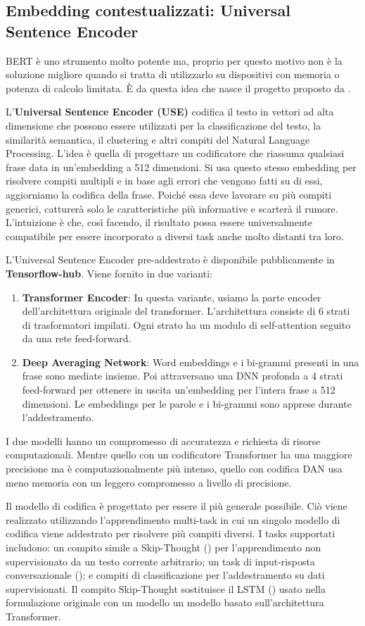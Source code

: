 \subsection{Embedding contestualizzati: Universal Sentence Encoder}
BERT è uno strumento molto potente ma, proprio per questo motivo non è la soluzione migliore quando si tratta di utilizzarlo su dispositivi con memoria o potenza di calcolo limitata. È da questa idea che nasce il progetto proposto da \citet{cer2018universal}.

L'\textbf{Universal Sentence Encoder (USE)} codifica il testo in vettori ad alta dimensione che possono essere utilizzati per la classificazione del testo, la similarità semantica, il clustering e altri compiti del Natural Language Processing. L'idea è quella di progettare un codificatore che riassuma qualsiasi frase data in un'embedding a 512 dimensioni. Si usa questo stesso embedding per risolvere compiti multipli e in base agli errori che vengono fatti su di essi, aggiorniamo la codifica della frase. Poiché essa deve lavorare su più compiti generici, catturerà solo le caratteristiche più informative e scarterà il rumore. L'intuizione è che, così facendo, il risultato possa essere universalmente compatibile per essere incorporato a diversi task anche molto distanti tra loro.

L'Universal Sentence Encoder pre-addestrato è disponibile pubblicamente in \textbf{Tensorflow-hub}. Viene fornito in due varianti:
\begin{enumerate}
    \item \textbf{Transformer Encoder}: In questa variante, usiamo la parte encoder dell'architettura originale del transformer. L'architettura consiste di 6 strati di trasformatori impilati. Ogni strato ha un modulo di self-attention seguito da una rete feed-forward.
    \item \textbf{Deep Averaging Network}: Word embeddings e i bi-grammi presenti in una frase sono mediate insieme. Poi attraversano una DNN profonda a 4 strati feed-forward per ottenere in uscita un'embedding per l'intera frase a 512 dimensioni. Le embeddings per le parole e i bi-grammi sono apprese durante l'addestramento.
\end{enumerate}
I due modelli hanno un compromesso di accuratezza e richiesta di risorse computazionali. Mentre quello con un codificatore Transformer ha una maggiore precisione ma è computazionalmente più intenso, quello con codifica DAN usa meno memoria con un leggero compromesso a livello di precisione.

Il modello di codifica è progettato per essere il più generale possibile. Ciò viene realizzato utilizzando l'apprendimento multi-task in cui un singolo modello di codifica viene addestrato per risolvere più compiti diversi. I tasks supportati includono: un compito simile a Skip-Thought (\citet{NIPS2015_f442d33f}) per l'apprendimento non supervisionato da un testo corrente arbitrario; un task di input-risposta conversazionale (\citet{henderson2017efficient}); e compiti di classificazione per l'addestramento su dati supervisionati. Il compito Skip-Thought sostituisce il LSTM (\citet{Hochreiter1997LongSM}) usato nella formulazione originale con un modello un modello basato sull'architettura Transformer. 
